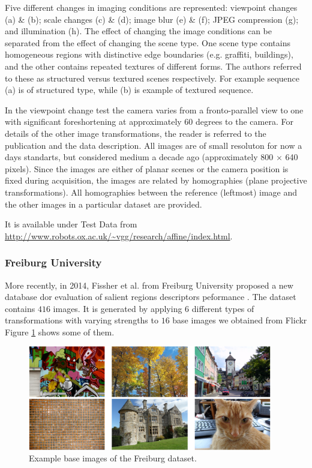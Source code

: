  Five different changes in imaging conditions are represented: viewpoint changes (a) \& (b); scale changes (c) \& (d); image blur (e) \& (f); JPEG compression (g); and illumination (h). The effect of changing the image conditions can be separated from
the effect of changing the scene type. One scene type contains homogeneous regions with distinctive edge boundaries (e.g. graffiti, buildings), and the other contains
repeated textures of different forms. The authors referred to these as structured versus textured scenes respectively. For example sequence (a) is of structured type, while (b) is example of textured sequence.

In the viewpoint change test the camera varies from a fronto-parallel view to one with significant foreshortening
at approximately 60 degrees to the camera. For details of the other image transformations, the reader is referred to the publication \cite{Mikolajczyk:2005} and the data description.   All images are of small resoluton for now a days standarts, but considered medium a decade ago (approximately 800 $\times$ 640 pixels).
Since the images are either of planar scenes or the camera position is fixed during acquisition, the images are related by homographies (plane
projective transformations). All homographies between the reference (leftmost) image and the other images in a particular dataset are provided.

It is available under Test Data from \url{http://www.robots.ox.ac.uk/~vgg/research/affine/index.html}.

\subsubsection{Freiburg University}
More recently, in 2014, Fissher et al. from Freiburg University  proposed a new database dor evaluation of salient regions descriptors peformance \cite{FischerDB14}. 
The dataset contains $416$ images. It is generated by applying $6$ different types of transformations with varying strengths to $16$ base images we obtained from Flickr
Figure \ref{fig:fischerDBdata} shows some of them.

\begin{figure}[H]
\begin{center}
\includegraphics[width=0.95\textwidth]{fig/MatchDBFreiburgBase}
\end{center}
\caption{Example base images of the Freiburg dataset.}
\label{fig:fischerDBdata}
\end{figure}

